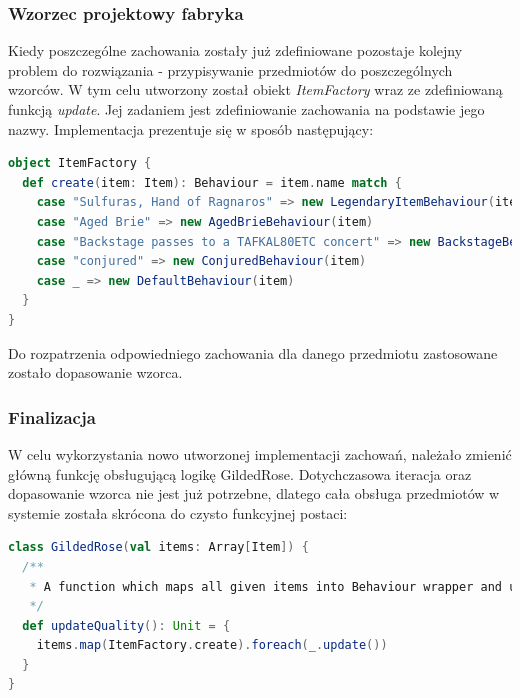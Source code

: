 \documentclass[a4paper, 11pt]{article}
\begin{document}
\subsubsection{Wzorzec projektowy fabryka}
Kiedy poszczególne zachowania zostały już zdefiniowane pozostaje kolejny problem do rozwiązania - przypisywanie przedmiotów do poszczególnych wzorców. W tym celu utworzony został obiekt \textit{ItemFactory} wraz ze zdefiniowaną funkcją \textit{update}. Jej zadaniem jest zdefiniowanie zachowania na podstawie jego nazwy. Implementacja prezentuje się w sposób następujący:
\begin{lstlisting}[language=scala]
 object ItemFactory {
  def create(item: Item): Behaviour = item.name match {
    case "Sulfuras, Hand of Ragnaros" => new LegendaryItemBehaviour(item)
    case "Aged Brie" => new AgedBrieBehaviour(item)
    case "Backstage passes to a TAFKAL80ETC concert" => new BackstageBehaviour(item)
    case "conjured" => new ConjuredBehaviour(item)
    case _ => new DefaultBehaviour(item)
  }
}
\end{lstlisting}
Do rozpatrzenia odpowiedniego zachowania dla danego przedmiotu zastosowane zostało dopasowanie wzorca.
\subsubsection{Finalizacja}
W celu wykorzystania nowo utworzonej implementacji zachowań, należało zmienić główną funkcję obsługującą logikę GildedRose. Dotychczasowa iteracja oraz dopasowanie wzorca nie jest już potrzebne, dlatego cała obsługa przedmiotów w systemie została skrócona do czysto funkcyjnej postaci:
\begin{lstlisting}[language=scala]
 class GildedRose(val items: Array[Item]) {
  /**
   * A function which maps all given items into Behaviour wrapper and updates its values.
   */
  def updateQuality(): Unit = {
    items.map(ItemFactory.create).foreach(_.update())
  }
}
\end{lstlisting}
\end{document}

